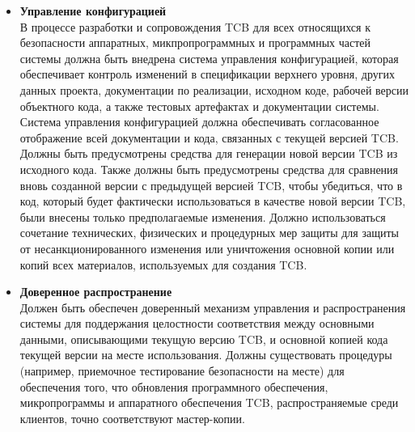 \begin{enumerate}
\begin{enumerate}
\begin{enumerate}
\begin{enumerate}
\begin{itemize}
                    и должно быть использовано сочетание формальных и неформальных методов, чтобы показать, что ФСВУ согласуется с моделью безопасности.
                    Эти доказательства должны соответствовать тем, которые предоставляются в рамках современного официальной используемой системы формальных спецификаций и верификаций, одобренной Центром компьютерной безопасности.
                    Для доказательства правильности реализации должно быть выполнено ручное или иное сопоставление ФСВУ с исходным кодом TCB.
                    \item{\textbf{Управление конфигурацией}}\\
                    В процессе разработки и сопровождения TCB для всех относящихся к безопасности аппаратных, микпропрограммных и программных частей системы должна быть внедрена система управления
                    конфигурацией, которая обеспечивает контроль изменений в спецификации верхнего уровня, других данных проекта, документации по реализации, исходном коде, рабочей версии
                    объектного кода, а также тестовых артефактах и документации системы. Система управления конфигурацией должна обеспечивать согласованное отображение всей документации и кода,
                    связанных с текущей версией TCB. Должны быть предусмотрены средства для генерации новой версии TCB из исходного кода. Также должны быть предусмотрены средства для сравнения
                    вновь созданной версии с предыдущей версией TCB, чтобы убедиться, что в код, который будет фактически использоваться в качестве новой версии TCB, были внесены только
                    предполагаемые изменения. Должно использоваться сочетание технических, физических и процедурных мер защиты для защиты от несанкционированного изменения или
                    уничтожения основной копии или копий всех материалов, используемых для создания TCB.
                    \item{\textbf{Доверенное распространение}}\\
                    Должен быть обеспечен доверенный механизм управления и распространения системы для поддержания целостности соответствия между основными данными, описывающими текущую версию TCB,
                    и основной копией кода текущей версии на месте использования. Должны существовать процедуры (например, приемочное тестирование безопасности на месте) для обеспечения того,
                    что обновления программного обеспечения, микропрограммы и аппаратного обеспечения TCB, распространяемые среди клиентов, точно соответствуют мастер-копии.
                \end{itemize}
            \end{enumerate}
        \end{enumerate}
	\end{enumerate}
\end{enumerate}


